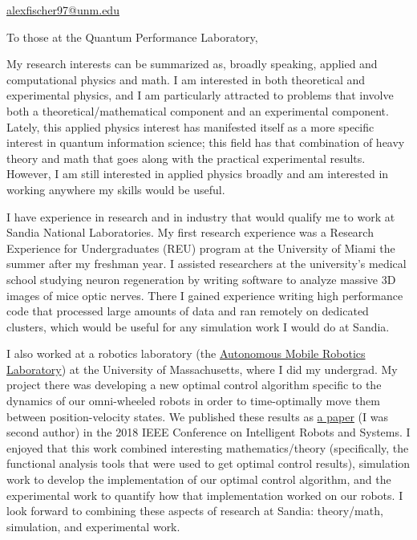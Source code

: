 \documentclass{article}
\title{}
\author{Alex Fischer}
\date{}
\begin{document}
	\maketitle
	\vspace{-3em}
	\begin{center}
		\href{mailto:alexfischer97@unm.edu}{alexfischer97@unm.edu}
	\end{center}
	
	To those at the Quantum Performance Laboratory,

	My research interests can be summarized as, broadly speaking, applied and computational physics and math. I am interested in both theoretical and experimental physics, and I am particularly attracted to problems that involve both a theoretical/mathematical component and an experimental component. Lately, this applied physics interest has manifested itself as a more specific interest in quantum information science; this field has that combination of heavy theory and math that goes along with the practical experimental results. However, I am still interested in applied physics broadly and am interested in working anywhere my skills would be useful.
	
	I have experience in research and in industry that would qualify me to work at Sandia National Laboratories. My first research experience was a Research Experience for Undergraduates (REU) program at the University of Miami the summer after my freshman year. I assisted researchers at the university's medical school studying neuron regeneration by writing software to analyze massive 3D images of mice optic nerves. There I gained experience writing high performance code that processed large amounts of data and ran remotely on dedicated clusters, which would be useful for any simulation work I would do at Sandia. 
	
	I also worked at a robotics laboratory (the \href{https://amrl.cs.umass.edu/}{Autonomous Mobile Robotics Laboratory}) at the University of Massachusetts, where I did my undergrad. My project there was developing a new optimal control algorithm specific to the dynamics of our omni-wheeled robots in order to time-optimally move them between position-velocity states. We published these results as \href{https://arxiv.org/abs/1707.04617}{a paper} (I was second author) in the 2018 IEEE Conference on Intelligent Robots and Systems. I enjoyed that this work combined interesting mathematics/theory (specifically, the functional analysis tools that were used to get optimal control results), simulation work to develop the implementation of our optimal control algorithm, and the experimental work to quantify how that implementation worked on our robots. I look forward to combining these aspects of research at Sandia: theory/math, simulation, and experimental work.
\end{document}
